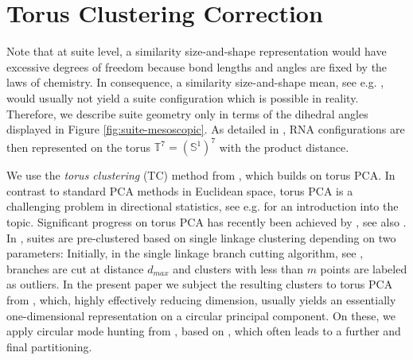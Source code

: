 \documentclass{llncs}
\newcommand{\TT}{\mathbb{T}}
\begin{document}
\section{Torus Clustering Correction}
Note that at suite level, a similarity size-and-shape representation would have excessive degrees of freedom because bond lengths and angles are fixed by the laws of chemistry. In consequence, a similarity size-and-shape mean, see e.g. \cite{Drydmard16}, would usually not yield a suite configuration which is possible in reality. Therefore, we describe suite geometry only in terms of the dihedral angles displayed in Figure \ref{fig:suite-mesoscopic}. As detailed in \cite{eltzner2018}, RNA configurations are then represented on the torus $\TT^7 =(\mathbb{S}^1)^7$ with the product distance.

We use the \emph{torus clustering} (TC) method from \cite{eltzner2015torus}, which builds on torus PCA. In contrast to standard PCA methods in Euclidean space, torus PCA is a challenging problem in directional statistics, see e.g. \cite{mardia2009directional} for an introduction into the topic. Significant progress on torus PCA has recently been achieved by \cite{eltzner2018}, see also \cite{eltzner2015dimension,eltzner2017applying}.
In \cite{eltzner2015torus}, suites are pre-clustered based on single linkage clustering depending on two parameters: 
Initially, in the single linkage branch cutting algorithm, see \cite[Appendix A.7]{eltzner2015torus}, branches are cut at distance $d_{max}$ and clusters with less than $m$ points are labeled as outliers. %
In the present paper we subject the resulting clusters to torus PCA from \cite{eltzner2018}, which, highly effectively reducing dimension, usually yields an essentially one-dimensional representation on a circular principal component. On these, we apply circular mode hunting from \cite{eltzner2018}, based on \cite{duembgen2008}, which often leads to a further and final partitioning. %

\end{document}
